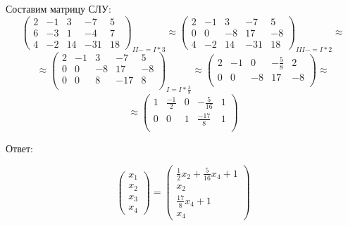 \documentclass[a4paper]{article}
\begin{document}
Составим матрицу СЛУ:
\begin{equation*}
    \left(\begin{array}{rrrr|r}
   2 & -1 & 3 & -7 &5\\
   6 & -3 & 1 & -4 & 7\\
  4 & -2 & 14 & -31 & 18 
   \end{array}\right)_{II -= I * 3}
   \approx
   \left(\begin{array}{rrrr|r}
   2 & -1 & 3 & -7 &5\\
   0 & 0 & -8 & 17 & -8\\
  4 & -2 & 14 & -31 & 18 
   \end{array}\right)_{III -= I * 2}
\approx
\end{equation*}
\begin{equation*}
\approx
   \left(\begin{array}{rrrr|r}
   2 & -1 & 3 & -7 &5\\
   0 & 0 & -8 & 17 & -8\\
   0 & 0 & 8 & -17 & 8\\
   \end{array}\right)_{I = I * \frac{3}{8}}
\approx
   \left(\begin{array}{rrrr|r}
    2 & -1 & 0 & -\frac{5}{8} &2\\
   0 & 0 & -8 & 17 & -8\\
   \end{array}\right)
  \approx
\end{equation*}
\begin{equation*}
\approx
   \left(\begin{array}{rrrr|r}
   1 & \frac{-1}{2} & 0 & -\frac{5}{16} &1\\
   0 & 0 & 1 & \frac{-17}{8} & 1\\
   \end{array}\right)
\end{equation*}

Ответ:

\begin{equation*}
\begin{pmatrix}
  x_1 \\
  x_2\\
  x_3\\
  x_4
\end{pmatrix} = 
\begin{pmatrix}
  \frac{1}{2} x_2 + \frac{5}{16}x_4 + 1\\
  x_2\\
  \frac{17}{8}x_4 + 1\\
	x_4
\end{pmatrix}
\end{equation*}
\end{document}
